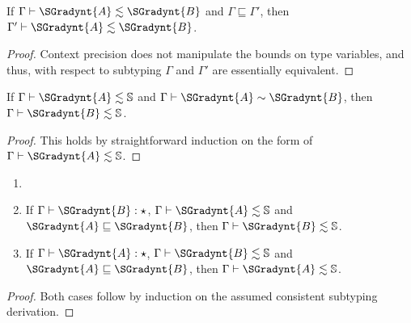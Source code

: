 \begin{lemma}
  \label{lemma:subtyping_context_precision}
  If $ \Gamma  \vdash  \SGradynt{A}  \lesssim  \SGradynt{B} $ and $ \Gamma  \sqsubseteq  \Gamma' $, then $ \Gamma'  \vdash  \SGradynt{A}  \lesssim  \SGradynt{B} $.
\end{lemma}
\begin{proof}
  Context precision does not manipulate the bounds on type variables, and thus,
  with respect to subtyping $\Gamma$ and $\Gamma'$ are essentially equivalent.
\end{proof}

\begin{lemma}
  \label{lemma:simply_typed_consistent_types_are_subtypes}
  If $ \Gamma  \vdash  \SGradynt{A}  \lesssim   \mathbb{S}  $ and $ \Gamma  \vdash  \SGradynt{A}  \sim  \SGradynt{B} $, then $ \Gamma  \vdash  \SGradynt{B}  \lesssim   \mathbb{S}  $.
\end{lemma}
\begin{proof}
  This holds by straightforward induction on the form of $ \Gamma  \vdash  \SGradynt{A}  \lesssim   \mathbb{S}  $.
\end{proof}

\begin{lemma}
  \label{lemma:type_precision_preserves_SL}
  \begin{enumerate}
  \item[]
  \item If $ \Gamma  \vdash  \SGradynt{B}  : \star $, $ \Gamma  \vdash  \SGradynt{A}  \lesssim   \mathbb{S}  $ and $ \SGradynt{A}  \sqsubseteq  \SGradynt{B} $, then $ \Gamma  \vdash  \SGradynt{B}  \lesssim   \mathbb{S}  $.
  \item If $ \Gamma  \vdash  \SGradynt{A}  : \star $, $ \Gamma  \vdash  \SGradynt{B}  \lesssim   \mathbb{S}  $ and $ \SGradynt{A}  \sqsubseteq  \SGradynt{B} $, then $ \Gamma  \vdash  \SGradynt{A}  \lesssim   \mathbb{S}  $.
  \end{enumerate}
\end{lemma}
\begin{proof}
  Both cases follow by induction on the assumed consistent subtyping
  derivation.
\end{proof}


